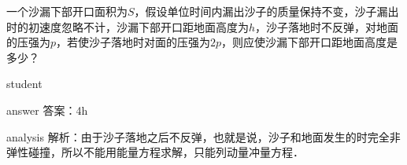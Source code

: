 \begin{example}
	一个沙漏下部开口面积为$ S $，假设单位时间内漏出沙子的质量保持不变，沙子漏出时的初速度忽略不计，沙漏下部开口距地面高度为$ h $，沙子落地时不反弹，对地面的压强为$ p $，若使沙子落地时对面的压强为$ 2p $，则应使沙漏下部开口距地面高度是多少？
	
	\begin{taggedblock}{student}
		\vspace*{2cm}
	\end{taggedblock}
	
	
	\begin{taggedblock}{answer}
		答案：4h
	\end{taggedblock}
	
	
	\begin{taggedblock}{analysis}
		解析：由于沙子落地之后不反弹，也就是说，沙子和地面发生的时完全非弹性碰撞，所以不能用能量方程求解，只能列动量冲量方程．
	\end{taggedblock}
\end{example}


